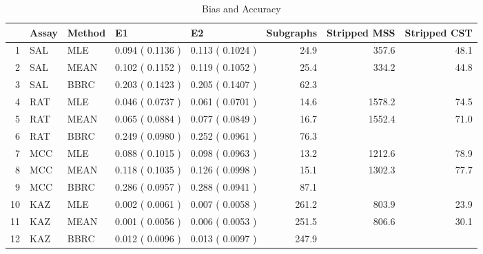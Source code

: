 \begin{table}[t]
\begin{center}
\begin{tabular}{rllllrrr}
  \hline
 & Assay & Method & E1 & E2 & Subgraphs & Stripped MSS & Stripped CST \\ 
  \hline
1 & SAL & MLE & 0.094 ( 0.1136 ) & 0.113 ( 0.1024 ) & 24.9 & 357.6 & 48.1 \\ 
  2 & SAL & MEAN & 0.102 ( 0.1152 ) & 0.119 ( 0.1052 ) & 25.4 & 334.2 & 44.8 \\ 
  3 & SAL & BBRC & 0.203 ( 0.1423 ) & 0.205 ( 0.1407 ) & 62.3 &  &  \\ 
  4 & RAT & MLE & 0.046 ( 0.0737 ) & 0.061 ( 0.0701 ) & 14.6 & 1578.2 & 74.5 \\ 
  5 & RAT & MEAN & 0.065 ( 0.0884 ) & 0.077 ( 0.0849 ) & 16.7 & 1552.4 & 71.0 \\ 
  6 & RAT & BBRC & 0.249 ( 0.0980 ) & 0.252 ( 0.0961 ) & 76.3 &  &  \\ 
  7 & MCC & MLE & 0.088 ( 0.1015 ) & 0.098 ( 0.0963 ) & 13.2 & 1212.6 & 78.9 \\ 
  8 & MCC & MEAN & 0.118 ( 0.1035 ) & 0.126 ( 0.0998 ) & 15.1 & 1302.3 & 77.7 \\ 
  9 & MCC & BBRC & 0.286 ( 0.0957 ) & 0.288 ( 0.0941 ) & 87.1 &  &  \\ 
  10 & KAZ & MLE & 0.002 ( 0.0061 ) & 0.007 ( 0.0058 ) & 261.2 & 803.9 & 23.9 \\ 
  11 & KAZ & MEAN & 0.001 ( 0.0056 ) & 0.006 ( 0.0053 ) & 251.5 & 806.6 & 30.1 \\ 
  12 & KAZ & BBRC & 0.012 ( 0.0096 ) & 0.013 ( 0.0097 ) & 247.9 &  &  \\ 
   \hline
\end{tabular}
\caption{Bias and Accuracy}
\label{t:anal}
\end{center}
\end{table}
